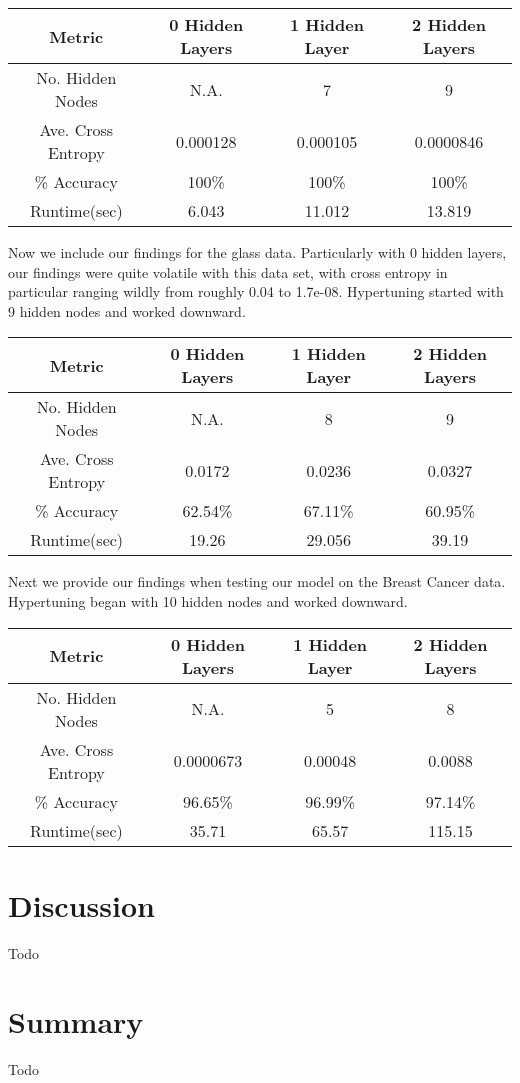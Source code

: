 \documentclass[twoside,11pt]{article}
\begin{document}
\begin{center}
	\begin{tabular}{|c c c c|}
		\hline
		Metric & 0 Hidden Layers & 1 Hidden Layer & 2 Hidden Layers \\ [0.5ex]
		\hline \hline
		No. Hidden Nodes & N.A. & 7 & 9 \\
		\hline
		Ave. Cross Entropy & 0.000128 & 0.000105 & 0.0000846 \\
		\hline
		\% Accuracy & 100\% & 100\% & 100\% \\
		\hline
		Runtime(sec) & 6.043 & 11.012 & 13.819 \\
		\hline
	\end{tabular}
\end{center}

Now we include our findings for the glass data. Particularly with 0 hidden layers, our findings were quite volatile
with this data set, with cross entropy in particular ranging wildly from roughly 0.04 to 1.7e-08. Hypertuning started
with 9 hidden nodes and worked downward.

\begin{center}
	\begin{tabular}{|c c c c|}
		\hline
		Metric & 0 Hidden Layers & 1 Hidden Layer & 2 Hidden Layers \\ [0.5ex]
		\hline \hline
		No. Hidden Nodes & N.A. & 8 & 9 \\
		\hline
		Ave. Cross Entropy & 0.0172 & 0.0236 & 0.0327 \\
		\hline
		\% Accuracy & 62.54\% & 67.11\% & 60.95\% \\
		\hline
		Runtime(sec) & 19.26 & 29.056 & 39.19 \\
		\hline
	\end{tabular}
\end{center}

Next we provide our findings when testing our model on the Breast Cancer data. Hypertuning began with 10
hidden nodes and worked downward.
\begin{center}
	\begin{tabular}{|c c c c|}
		\hline
		Metric & 0 Hidden Layers & 1 Hidden Layer & 2 Hidden Layers \\ [0.5ex]
		\hline \hline
		No. Hidden Nodes & N.A. & 5 & 8 \\
		\hline
		Ave. Cross Entropy & 0.0000673 & 0.00048 & 0.0088 \\
		\hline
		\% Accuracy & 96.65\% & 96.99\% & 97.14\% \\
		\hline
		Runtime(sec) & 35.71 & 65.57 & 115.15 \\
		\hline
	\end{tabular}
\end{center}
\section{Discussion}
Todo


\section{Summary}
Todo
\end{document}
